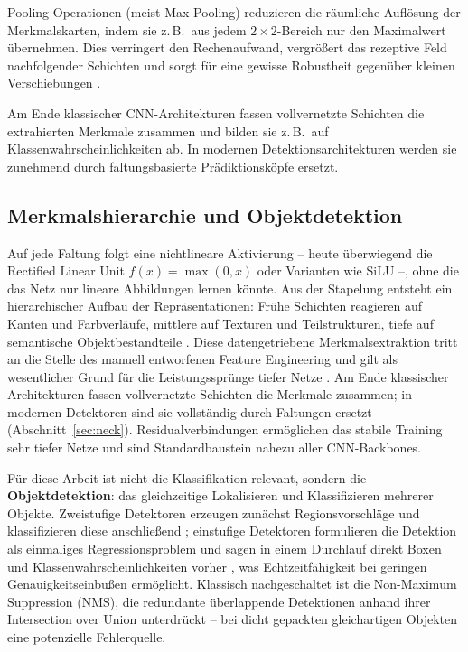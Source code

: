  Pooling-Operationen (meist Max-Pooling) reduzieren
die räumliche Auflösung der Merkmalskarten, indem sie z.\,B.\ aus jedem
$2\times2$-Bereich nur den Maximalwert übernehmen. Dies verringert den
Rechenaufwand, vergrößert das rezeptive Feld nachfolgender Schichten und sorgt
für eine gewisse Robustheit gegenüber kleinen Verschiebungen
\parencite{goodfellow2016}.

 Am Ende klassischer
CNN-Architekturen fassen vollvernetzte Schichten die extrahierten Merkmale
zusammen und bilden sie z.\,B.\ auf Klassenwahrscheinlichkeiten ab. In modernen
Detektionsarchitekturen werden sie zunehmend durch faltungsbasierte
Prädiktionsköpfe ersetzt.

\subsection{Merkmalshierarchie und Objektdetektion}
\label{sec:hierarchie}

Auf jede Faltung folgt eine nichtlineare Aktivierung -- heute überwiegend die
Rectified Linear Unit $f(x) = \max(0,x)$ oder Varianten wie SiLU
\parencite{krizhevsky2012} --, ohne die das Netz nur lineare Abbildungen lernen
könnte. Aus der Stapelung entsteht ein hierarchischer Aufbau der
Repräsentationen: Frühe Schichten reagieren auf Kanten und Farbverläufe, mittlere
auf Texturen und Teilstrukturen, tiefe auf semantische Objektbestandteile
\parencite{zeiler2014}. Diese datengetriebene Merkmalsextraktion tritt an die
Stelle des manuell entworfenen Feature Engineering und gilt als wesentlicher
Grund für die Leistungssprünge tiefer Netze \parencite{lecun2015}. Am Ende
klassischer Architekturen fassen vollvernetzte Schichten die Merkmale zusammen;
in modernen Detektoren sind sie vollständig durch Faltungen ersetzt
(Abschnitt~\ref{sec:neck}). Residualverbindungen \parencite{he2016} ermöglichen
das stabile Training sehr tiefer Netze und sind Standardbaustein nahezu aller
CNN-Backbones.

Für diese Arbeit ist nicht die Klassifikation relevant, sondern die
\textbf{Objektdetektion}: das gleichzeitige Lokalisieren und Klassifizieren
mehrerer Objekte. Zweistufige Detektoren erzeugen zunächst Regionsvorschläge und
klassifizieren diese anschließend \parencite{ren2015}; einstufige Detektoren
formulieren die Detektion als einmaliges Regressionsproblem und sagen in einem
Durchlauf direkt Boxen und Klassenwahrscheinlichkeiten vorher
\parencite{redmon2016,liu2016ssd}, was Echtzeitfähigkeit bei geringen
Genauigkeitseinbußen ermöglicht. Klassisch nachgeschaltet ist die
Non-Maximum Suppression (NMS), die redundante überlappende Detektionen anhand
ihrer Intersection over Union unterdrückt -- bei dicht gepackten gleichartigen
Objekten eine potenzielle Fehlerquelle.

